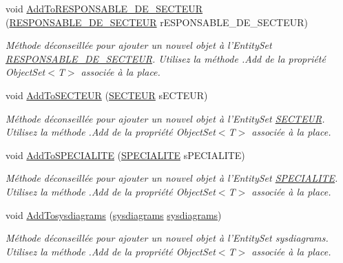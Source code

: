 \begin{DoxyCompactItemize}
void \hyperlink{class_model_1_1_b_d_d___s_i_o7_entities_a5ae40a9b13130c06ad72686eccf0c651}{Add\-To\-R\-E\-S\-P\-O\-N\-S\-A\-B\-L\-E\-\_\-\-D\-E\-\_\-\-S\-E\-C\-T\-E\-U\-R} (\hyperlink{class_model_1_1_r_e_s_p_o_n_s_a_b_l_e___d_e___s_e_c_t_e_u_r}{R\-E\-S\-P\-O\-N\-S\-A\-B\-L\-E\-\_\-\-D\-E\-\_\-\-S\-E\-C\-T\-E\-U\-R} r\-E\-S\-P\-O\-N\-S\-A\-B\-L\-E\-\_\-\-D\-E\-\_\-\-S\-E\-C\-T\-E\-U\-R)
\begin{DoxyCompactList}\small\item\em Méthode déconseillée pour ajouter un nouvel objet à l'Entity\-Set \hyperlink{class_model_1_1_r_e_s_p_o_n_s_a_b_l_e___d_e___s_e_c_t_e_u_r}{R\-E\-S\-P\-O\-N\-S\-A\-B\-L\-E\-\_\-\-D\-E\-\_\-\-S\-E\-C\-T\-E\-U\-R}. Utilisez la méthode .Add de la propriété Object\-Set$<$T$>$ associée à la place. \end{DoxyCompactList}\item 
void \hyperlink{class_model_1_1_b_d_d___s_i_o7_entities_a318cd3b2de71c646c8bed25e9d6eb058}{Add\-To\-S\-E\-C\-T\-E\-U\-R} (\hyperlink{class_model_1_1_s_e_c_t_e_u_r}{S\-E\-C\-T\-E\-U\-R} s\-E\-C\-T\-E\-U\-R)
\begin{DoxyCompactList}\small\item\em Méthode déconseillée pour ajouter un nouvel objet à l'Entity\-Set \hyperlink{class_model_1_1_s_e_c_t_e_u_r}{S\-E\-C\-T\-E\-U\-R}. Utilisez la méthode .Add de la propriété Object\-Set$<$T$>$ associée à la place. \end{DoxyCompactList}\item 
void \hyperlink{class_model_1_1_b_d_d___s_i_o7_entities_a64639974a9e6ce0b8100dd1066da38de}{Add\-To\-S\-P\-E\-C\-I\-A\-L\-I\-T\-E} (\hyperlink{class_model_1_1_s_p_e_c_i_a_l_i_t_e}{S\-P\-E\-C\-I\-A\-L\-I\-T\-E} s\-P\-E\-C\-I\-A\-L\-I\-T\-E)
\begin{DoxyCompactList}\small\item\em Méthode déconseillée pour ajouter un nouvel objet à l'Entity\-Set \hyperlink{class_model_1_1_s_p_e_c_i_a_l_i_t_e}{S\-P\-E\-C\-I\-A\-L\-I\-T\-E}. Utilisez la méthode .Add de la propriété Object\-Set$<$T$>$ associée à la place. \end{DoxyCompactList}\item 
void \hyperlink{class_model_1_1_b_d_d___s_i_o7_entities_a729996d8d2afd99e05fcaaed4c232af6}{Add\-Tosysdiagrams} (\hyperlink{class_model_1_1sysdiagrams}{sysdiagrams} \hyperlink{class_model_1_1sysdiagrams}{sysdiagrams})
\begin{DoxyCompactList}\small\item\em Méthode déconseillée pour ajouter un nouvel objet à l'Entity\-Set sysdiagrams. Utilisez la méthode .Add de la propriété Object\-Set$<$T$>$ associée à la place. \end{DoxyCompactList}\item 

\end{DoxyCompactItemize}
